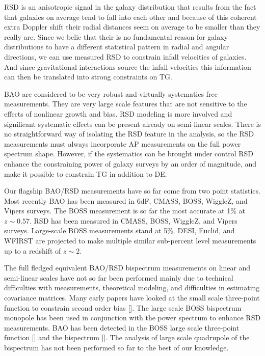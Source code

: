 RSD is an anisotropic signal in the galaxy distribution that results from the fact that galaxies on average tend to fall into each other and because of this
coherent extra Doppler shift their radial distances seem on average to be smaller than they really are. Since we belie that their is no fundamental reason for
galaxy distributions to have a different statistical pattern in radial and angular directions, we can use measured RSD to constrain infall velocities of galaxies.
And since gravitational interactions source the infall velocities this information can then be translated into strong constraints on TG.

BAO are considered to be very robust and virtually systematics free measurements. They are very large scale features that are not sensitive to the effects of
nonlinear growth and bias. RSD modeling is more involved and significant systematic effects can be present already on semi-linear scales. 
There is no straightforward way of isolating the RSD feature in the analysis, so the RSD measurements must always incorporate AP measurements on the full 
power spectrum shape. However, if the systematics can be brought under control RSD enhance the constraining power of galaxy surveys by an order of magnitude,
and make it possible to constrain TG in addition to DE.

Our flagship BAO/RSD measurements have so far come from two point statistics. Most recently BAO has been measured in 6dF, CMASS, BOSS, WiggleZ, and Vipers surveys.
The BOSS measurement is so far the most accurate at 1\% at $z\sim0.57$. RSD has been measured in CMASS, BOSS, WiggleZ, and Vipers surveys. Large-scale BOSS
measurements stand at 5\%. DESI, Euclid, and WFIRST are projected to make multiple similar sub-percent level measurements up to a redshift of $z\sim 2$.

The full fledged equivalent BAO/RSD bispectrum measurements on linear and semi-linear scales have not so far been performed mainly due to technical difficulties
with measurements, theoretical modeling, and difficulties in estimating covariance matrices. Many early papers have looked at the small scale three-point function
to constrain second order bias []. The large scale BOSS bispectrum monopole has been used in conjunction with the power spectrum to enhance RSD measurements.
BAO has been detected in the BOSS large scale three-point function [] and the bispectrum []. The analysis of large scale quadrupole of the bispectrum has not
been performed so far to the best of our knowledge.

